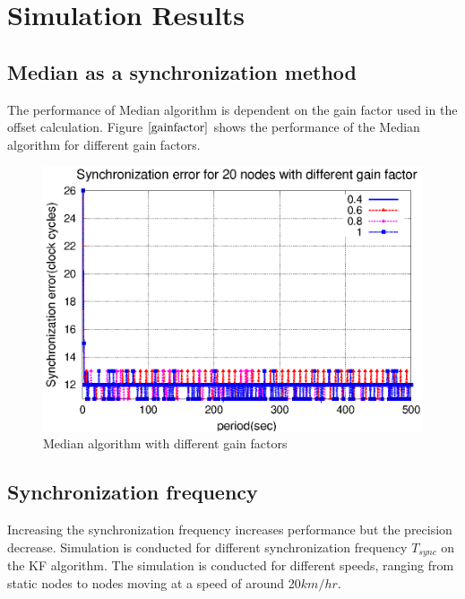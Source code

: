 \documentclass[a4paper,10pt]{report}
\begin{document}
\chapter{Simulation Results}
\section{\textbf{Median as a synchronization method}}
The performance of Median algorithm is dependent on the gain factor used in the offset calculation. Figure $\ref{gainfactor}$ shows the performance of the Median algorithm for different gain factors.
\begin{figure}[!h]
\centering
\includegraphics[width= 0.7 \textwidth]{gainfactor}
\caption{Median algorithm with different gain factors} \label{gainfactor}
\end{figure}
\section{\textbf{Synchronization frequency}}
Increasing the synchronization frequency increases performance but the precision decrease. Simulation is conducted for different synchronization frequency $T_{sync}$ on the KF algorithm. The simulation is conducted for different speeds, ranging from static nodes to nodes moving at a speed of around 20$km/hr$.
\end{document}
